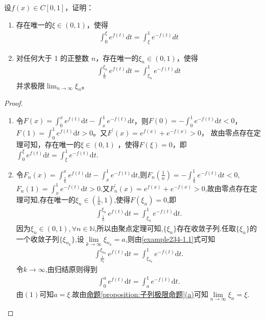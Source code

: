 \documentclass[../../main.tex]{subfiles}
\begin{document}
\begin{example}
设$f(x)\in C[0,1]$，证明：
\begin{enumerate}[(1)]
\item 存在唯一的$\xi\in(0,1)$，使得
\begin{align*}
\int_{0}^{\xi}e^{f(t)}dt=\int_{\xi}^{1}e^{-f(t)}dt
\end{align*}

\item 对任何大于 1 的正整数 $n$，存在唯一的$\xi_n\in(0,1)$，使得
\begin{align*}
\int_{\frac{1}{n}}^{\xi_n}e^{f(t)}dt=\int_{\xi_n}^{1}e^{-f(t)}dt
\end{align*}
并求极限$\lim_{n \to \infty}\xi_n$。
\end{enumerate}
\end{example}
\begin{proof}
\begin{enumerate}[(1)]
\item 令$F(x) = \int_0^x e^{f(t)} \mathrm{d}t - \int_x^1 e^{-f(t)} \mathrm{d}t$，则$F(0) = -\int_0^1 e^{-f(t)} \mathrm{d}t < 0$，$F(1) = \int_0^1 e^{f(t)} \mathrm{d}t > 0$。又$F^\prime(x) = e^{f(x)} + e^{-f(x)} > 0$，
故由零点存在定理可知，存在唯一的$\xi \in (0,1)$ ，使得$F(\xi) = 0$，即$\int_0^{\xi} e^{f(t)} \mathrm{d}t = \int_{\xi}^1 e^{-f(t)} \mathrm{d}t$.

\item 令$F_n(x)=\int_{\frac{1}{n}}^x{e^{f(t)}\mathrm{d}t}-\int_x^1{e^{-f(t)}\mathrm{d}t}$,则$F_n\left(\frac{1}{n}\right)=-\int_{\frac{1}{n}}^1{e^{-f(t)}\mathrm{d}t}<0$,$F_n(1)=\int_x^1{e^{-f(t)}\mathrm{d}t}>0$.又$F_{n}^{\prime}(x)=e^{f(x)}+e^{-f(x)}>0$,故由零点存在定理可知,存在唯一的$\xi_n\in\left(\frac{1}{n},1\right)$,使得$F(\xi_n)=0$,即
\begin{align}
\int_{\frac{1}{n}}^{\xi_n}{e^{f(t)}\mathrm{d}t}=\int_{\xi_n}^1{e^{-f(t)}\mathrm{d}t}.\label{example234-1.1}
\end{align}
因为$\xi_n\in(0,1),\forall n\in\mathbb{N}$,所以由聚点定理可知,$\{\xi_n\}$存在收敛子列.任取$\{\xi_n\}$的一个收敛子列$\{\xi_{n_k}\}$,设$\underset{k\rightarrow\infty}{\lim}\xi_{n_k}=a$,则由\eqref{example234-1.1}式可知
\begin{align*}
\int_{\frac{1}{n_k}}^{\xi_{n_k}}{e^{f(t)}\mathrm{d}t}=\int_{\xi_{n_k}}^1{e^{-f(t)}\mathrm{d}t}.
\end{align*}
令$k\rightarrow\infty$,由归结原则得到
\begin{align*}
\int_0^a{e^{f(t)}\mathrm{d}t}=\int_a^1{e^{-f(t)}\mathrm{d}t}.
\end{align*}
由$(1)$可知$a=\xi$.故由\hyperref[proposition:子列极限命题]{命题\ref{proposition:子列极限命题}(a)}可知$\underset{n\rightarrow\infty}{\lim}\xi_n=\xi$.
\end{enumerate}
\end{proof}
\end{document}
